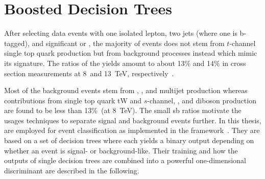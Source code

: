 

\section{Boosted Decision Trees}

After selecting data events with one isolated lepton, two jets (where one is b-tagged), and significant \met or \mtw, the majority of events does not stem from $t$-channel single top quark production but from background processes instead which mimic its signature. The ratios of the  yields amount to about 13\% and 14\% in cross section measurements at 8~and 13~TeV, respectively~\cite{Khachatryan:2014iya,Sirunyan:2016cdg}. 

Most of the background events stem from \wjets, \ttbar, and multijet production whereas contributions from single top quark tW and $s$-channel, \zjets, and diboson production are found to be less than 13\%~(at 8~TeV).  The small \gls{sb} ratios motivate the usages  techniques to separate signal and background events further. In this thesis,  are employed for event classification as implemented in the \TMVA[format=hyperbf] framework~\cite{Hocker:2007ht}. They are based on a set of decision trees where each yields a binary output depending on whether an event is signal- or background-like. Their training and how the outputs of single decision trees are combined into a powerful one-dimensional discriminant are described in the following.

